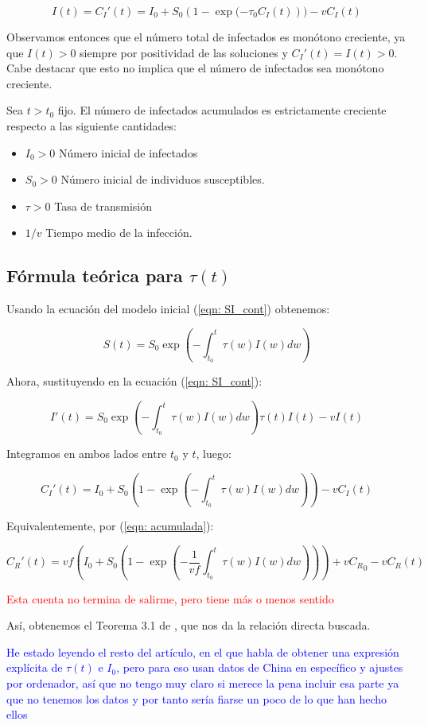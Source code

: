$$I(t)=C_I'(t)=I_0+S_0(1-\exp{(-\tau_0 C_I(t)}))-vC_I(t)$$
 
Observamos entonces que el número total de infectados es monótono creciente, ya que $I(t)>0$ siempre por positividad de las soluciones y $C_I'(t)=I(t)>0$. Cabe destacar que esto no implica que el número de infectados sea monótono creciente.

\begin{theorem}
Sea $t>t_0$ fijo. El número de infectados acumulados es estrictamente creciente respecto a las siguiente cantidades:
\begin{itemize}
\item $I_0>0$ Número inicial de infectados
\item $S_0>0$ Número inicial de individuos susceptibles.
\item $\tau>0$ Tasa de transmisión
\item $1/v$ Tiempo medio de la infección.
\end{itemize}
\end{theorem}

\subsection{Fórmula teórica para $\tau (t)$}

Usando la ecuación del modelo inicial (\ref{eqn: SI_cont}) obtenemos:

$$S(t) = S_0 \exp{\left( - \int_{t_0}^t \tau(w) I(w) dw \right) } $$ 

Ahora, sustituyendo en la ecuación (\ref{eqn: SI_cont}):

$$I'(t) = S_0 \exp{\left( - \int_{t_0}^t \tau(w) I(w) dw \right) } \tau (t) I(t) -vI(t) $$

Integramos en ambos lados entre $t_0$ y $t$, luego:

$$ C_I'(t) = I_0 + S_0 \left( 1-\exp{\left(- \int_{t_0}^t \tau (w) I(w)dw \right)}\right) -vC_I(t)$$

Equivalentemente, por (\ref{eqn: acumulada}):

$$C_R'(t) = vf\left( I_0 + S_0 \left( 1-\exp{\left(- \frac{1}{vf}\int_{t_0}^t \tau (w ) I(w)dw \right)}\right)\right) +v{C_R}_0 -vC_R(t)$$

\textcolor{red}{Esta cuenta no termina de salirme, pero tiene más o menos sentido}

Así, obtenemos el Teorema 3.1 de \cite{demongeotSIEpidemicModel}, que nos da la relación directa buscada.

\textcolor{blue}{He estado leyendo el resto del artículo, en el que habla de obtener una expresión explícita de $\tau (t)$ e $I_0$, pero para eso usan datos de China en específico y ajustes por ordenador, así que no tengo muy claro si merece la pena incluir esa parte ya que no tenemos los datos y por tanto sería fiarse un poco de lo que han hecho ellos}







